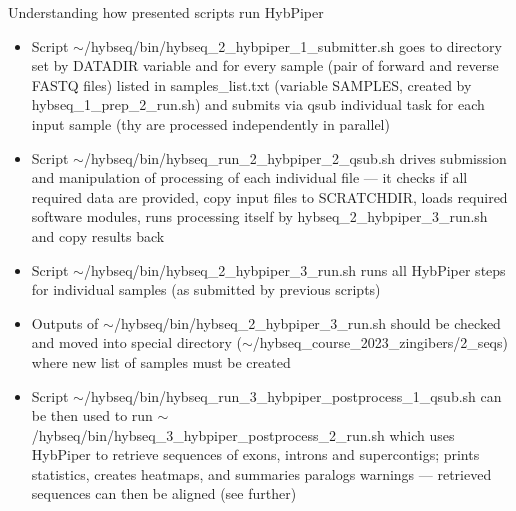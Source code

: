 \documentclass[compress, ucs, xelatex, 11pt, xcolor=x11names, aspectratio=169,
	hyperref={
		bookmarks=true,
		unicode=true,
		colorlinks=true,
		pdftitle={HybSeq course},
		plainpages=false,
		pdfauthor={Vojtech Zeisek},
		pdfsubject={Practical processing of HybSeq target enrichment sequencing data on computing grids like MetaCentrum},
		pdfcreator={XeLaTeX},
		pdfkeywords={BASH, command line, GNU, HybSeq, Linux, MetaCentrum, sequencing shell, target enrichment},
		linkcolor=Turquoise4, %
		anchorcolor=DodgerBlue4, %
		citecolor=DodgerBlue4, %
		filecolor=DodgerBlue4, %
		menucolor=Tan4, %
		urlcolor=DarkOliveGreen4, %
		pdftex},
	url={hyphens, lowtilde} %
	]{beamer}
\renewcommand{\texttt}[1]{\colorbox{Cornsilk2}{{\ttfamily #1}}}
\begin{document}
\begin{frame}[allowframebreaks]{Understanding how presented scripts run HybPiper}
	\begin{itemize}
		\item Script \texttt{$\sim$/hybseq/bin/hybseq\_2\_hybpiper\_1\_submitter.sh} goes to directory set by \texttt{DATADIR} variable and for every sample (pair of forward and reverse FASTQ files) listed in \texttt{samples\_list.txt} (variable \texttt{SAMPLES}, created by \texttt{hybseq\_1\_prep\_2\_run.sh}) and submits via \texttt{qsub} individual task for each input sample (thy are processed independently in parallel)
		\item Script \texttt{$\sim$/hybseq/bin/hybseq\_run\_2\_hybpiper\_2\_qsub.sh} drives submission and manipulation of processing of each individual file --- it checks if all required data are provided, copy input files to \texttt{SCRATCHDIR}, loads required software modules, runs processing itself by \texttt{hybseq\_2\_hybpiper\_3\_run.sh} and copy results back
		\item Script \texttt{$\sim$/hybseq/bin/hybseq\_2\_hybpiper\_3\_run.sh} runs all HybPiper steps for individual samples (as submitted by previous scripts)
		\item Outputs of \texttt{$\sim$/hybseq/bin/hybseq\_2\_hybpiper\_3\_run.sh} should be checked and moved into special directory (\texttt{$\sim$/hybseq\_course\_2023\_zingibers/2\_seqs}) where new list of samples must be created
		\item Script \texttt{$\sim$/hybseq/bin/hybseq\_run\_3\_hybpiper\_postprocess\_1\_qsub.sh} can be then used to run \texttt{$\sim$/hybseq/bin/hybseq\_3\_hybpiper\_postprocess\_2\_run.sh} which uses HybPiper to retrieve sequences of exons, introns and supercontigs; prints statistics, creates heatmaps, and summaries paralogs warnings --- retrieved sequences can then be aligned (see further)
	\end{itemize}
\end{frame}
\end{document}
